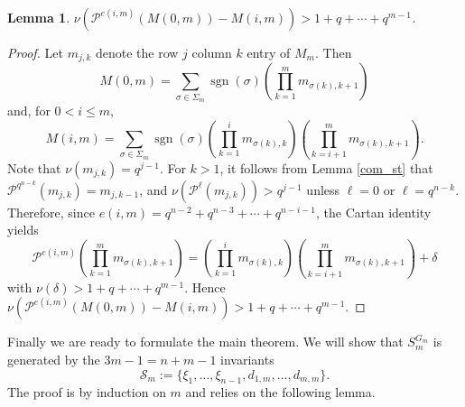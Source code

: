 \documentclass{amsart}
\newcommand{\PP}{\mathcal{P}}
\newcommand{\cS}{\mathcal{S}}
\newtheorem{lem}[subsection]{Lemma}
\DeclareMathOperator{\sgn}{sgn}
\begin{document}
\begin{lem} \label{nu_min_lem} $\nu(\PP^{e(i,m)}(M(0,m))-M(i,m))>1+q+\cdots +q^{m-1}$.
\end{lem}
\begin{proof} Let $m_{j,k}$ denote the row $j$ column $k$ entry of $M_m$.
Then
$$M(0,m)=\sum_{\sigma\in\Sigma_m}\sgn(\sigma)\left(\prod_{k=1}^m m_{\sigma(k),k+1}\right)$$
and, for $0<i\leq m$,
$$M(i,m)=\sum_{\sigma\in\Sigma_m}\sgn(\sigma)\left(\prod_{k=1}^{i} m_{\sigma(k),k}\right)\left(\prod_{k=i+1}^m m_{\sigma(k),k+1}\right).$$
Note that $\nu(m_{j,k})=q^{j-1}$. For $k>1$, it follows from Lemma \ref{com_st} that $\PP^{q^{n-k}}(m_{j,k})=m_{j,k-1}$,
and $\nu(\PP^{\ell}(m_{j,k}))>q^{j-1}$ unless $\ell=0$ or $\ell=q^{n-k}$.
Therefore, since $e(i,m)=q^{n-2}+q^{n-3}+\cdots +q^{n-i-1}$, the Cartan identity yields
$$\PP^{e(i,m)}\left(\prod_{k=1}^m m_{\sigma(k),k+1}\right)
=\left(\prod_{k=1}^{i} m_{\sigma(k),k}\right)\left(\prod_{k=i+1}^m m_{\sigma(k),k+1}\right)+\delta$$
with $\nu(\delta)>1+q+\cdots +q^{m-1}$.
Hence $\nu(\PP^{e(i,m)}(M(0,m))-M(i,m))>1+q+\cdots +q^{m-1}$.
\end{proof}

Finally we are ready to formulate the main theorem.
We will show that $S_m^{G_m}$ is generated by the $3m-1=n+m-1$ invariants
$$\cS_m:=\{\xi_1,\ldots,\xi_{n-1},d_{1,m},\ldots,d_{m,m}\}.$$
The proof is by induction on $m$ and relies on the following lemma.

\end{document}
